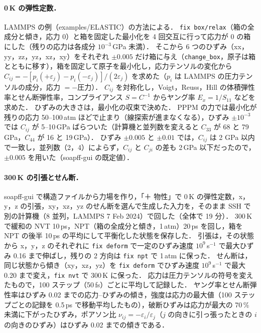 \documentclass[a4paper,11pt]{article}
\begin{document}
\paragraph{0\,K の弾性定数．}
LAMMPS の例（examples/ELASTIC）の方法による．
\texttt{fix box/relax}（箱の全成分と傾き，応力 0）と箱を固定した最小化を 4 回交互に行って応力が 0 の箱にした（残りの応力は各成分 $10^{-3}$\,GPa 未満）．
そこから 6 つのひずみ（xx，yy，zz，yz，xz，xy）をそれぞれ $\pm 0.005$ だけ箱に与え（\texttt{change\_box}，原子は箱とともに移す），箱を固定して原子を最小化し，応力テンソルの変化から $C_{ij} = -\left[p_i(+\varepsilon_j)-p_i(-\varepsilon_j)\right]/(2\varepsilon_j)$ を求めた（$p_i$ は LAMMPS の圧力テンソルの成分，応力 $=-$圧力）．
$C_{ij}$ を対称化し，Voigt，Reuss，Hill の体積弾性率とせん断弾性率，コンプライアンス $S=C^{-1}$ からヤング率 $E_x=1/S_{11}$ などを求めた．
ひずみの大きさは，最小化の収束で決めた．
PPPM の力では最小化が残りの応力 50--100\,atm ほどで止まり（線探索が進まなくなる），ひずみ $\pm10^{-3}$ では $C_{ij}$ が 5--10\,GPa ばらついた（計算機と並列数を変えると $C_{33}$ が 68 と 79\,GPa，$C_{44}$ が 16 と 19\,GPa）．
ひずみ $\pm0.005$ と $\pm0.01$ では，$C_{ij}$ は 2 GPa 以内で一致し，並列数（2，4）によらず，$C_{ij}$ と $C_{ji}$ の差も 2\,GPa 以下だったので，$\pm0.005$ を用いた（soapff-gui の既定値）．
\paragraph{300\,K の引張とせん断．}
soapff-gui で構造ファイルから力場を作り，「＋ 物性」で 0\,K の弾性定数，x，y，z の引張，xy，xz，yz のせん断を選んで生成した入力を，そのまま SSH で別の計算機（8 並列，LAMMPS 7 Feb 2024）で回した（全体で 19 分）．
300\,K で緩和の NVT 10\,ps，NPT（箱の全成分と傾き，1\,atm）20\,ps を回し，箱を NPT の後半 10\,ps の平均にして平衡化した状態を保存した．
引張は，その状態から x，y，z のそれぞれに \texttt{fix deform} で一定のひずみ速度 $10^{9}$\,s$^{-1}$ で最大ひずみ 0.16 まで伸ばし，残りの 2 方向は \texttt{fix npt} で 1\,atm に保った．
せん断は，同じ状態から傾き（xy，xz，yz）を \texttt{fix deform} でひずみ速度 $10^{9}$\,s$^{-1}$ で最大 0.20 まで変え，\texttt{fix nvt} で 300\,K に保った．
応力は圧力テンソルの符号を変えたもので，100 ステップ（50\,fs）ごとに平均して記録した．
ヤング率とせん断弾性率はひずみ 0.02 までの応力--ひずみの傾き，強度は応力の最大値（100 ステップごとの記録を 0.5\,ps で移動平均したもの），破断ひずみは応力が最大の 70\,\% 未満に下がったひずみ，ポアソン比 $\nu_{ij}=-\varepsilon_i/\varepsilon_j$（$j$ の向きに引っ張ったときの $i$ の向きのひずみ）はひずみ 0.02 までの傾きである．
\end{document}
